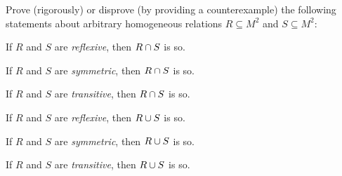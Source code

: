 \documentclass[a4paper,12pt]{article}
\begin{document}
\begin{tasks}
\begin{multicols}{2}
\begin{subtasks}







    \end{subtasks}
    \end{multicols}


    \item Prove (rigorously) or disprove (by providing a counterexample) the following statements about arbitrary homogeneous relations $R \subseteq M^2$ and $S \subseteq M^2$:

    \begin{multicols}{2}
    \begin{subtasks}
        \item If $R$ and $S$ are \textit{reflexive}, then $R \cap S$ is so.
        \item If $R$ and $S$ are \textit{symmetric}, then $R \cap S$ is so.
        \item If $R$ and $S$ are \textit{transitive}, then $R \cap S$ is so.
        \item If $R$ and $S$ are \textit{reflexive}, then $R \cup S$ is so.
        \item If $R$ and $S$ are \textit{symmetric}, then $R \cup S$ is so.
        \item If $R$ and $S$ are \textit{transitive}, then $R \cup S$ is so.
    \end{subtasks}
    \end{multicols}



\end{tasks}
\end{document}
